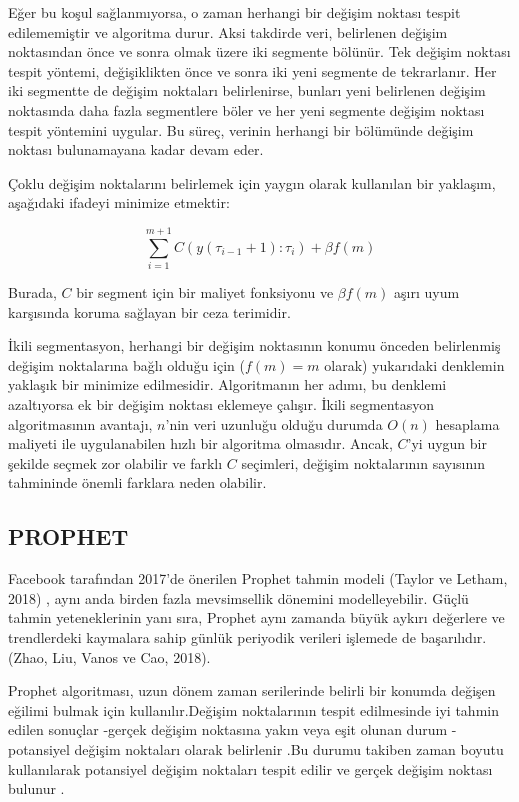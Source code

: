 \documentclass[12pt,twoside]{deuthesis}
\begin{document}
Eğer bu koşul sağlanmıyorsa, o zaman herhangi bir değişim noktası tespit edilememiştir ve algoritma durur. Aksi takdirde veri, belirlenen değişim noktasından önce ve sonra olmak üzere iki segmente bölünür. Tek değişim noktası tespit yöntemi, değişiklikten önce ve sonra iki yeni segmente de tekrarlanır. Her iki segmentte de değişim noktaları belirlenirse, bunları yeni belirlenen değişim noktasında daha fazla segmentlere böler ve her yeni segmente değişim noktası tespit yöntemini uygular. Bu süreç, verinin herhangi bir bölümünde değişim noktası bulunamayana kadar devam eder.

Çoklu değişim noktalarını belirlemek için yaygın olarak kullanılan bir yaklaşım, aşağıdaki ifadeyi minimize etmektir:

\[\sum_{i=1}^{m+1} C(y(\tau_{i-1}+1):\tau_i) + \beta f(m)\]

Burada, \(C\) bir segment için bir maliyet fonksiyonu ve \(\beta f(m)\) aşırı uyum karşısında koruma sağlayan bir ceza terimidir.

İkili segmentasyon, herhangi bir değişim noktasının konumu önceden belirlenmiş değişim noktalarına bağlı olduğu için (\(f(m) = m\) olarak) yukarıdaki denklemin yaklaşık bir minimize edilmesidir. Algoritmanın her adımı, bu denklemi azaltıyorsa ek bir değişim noktası eklemeye çalışır. İkili segmentasyon algoritmasının avantajı, \(n\)'nin veri uzunluğu olduğu durumda \(O(n)\) hesaplama maliyeti ile uygulanabilen hızlı bir algoritma olmasıdır. Ancak, \(C\)'yi uygun bir şekilde seçmek zor olabilir ve farklı \(C\) seçimleri, değişim noktalarının sayısının tahmininde önemli farklara neden olabilir.

\hypertarget{prophet}{%
\subsection{PROPHET}\label{prophet}}

Facebook tarafından 2017'de önerilen Prophet tahmin modeli (Taylor ve Letham, 2018) , aynı anda birden fazla mevsimsellik dönemini modelleyebilir. Güçlü tahmin yeteneklerinin yanı sıra, Prophet aynı zamanda büyük aykırı değerlere ve trendlerdeki kaymalara sahip günlük periyodik verileri işlemede de başarılıdır.(Zhao, Liu, Vanos ve Cao, 2018).

Prophet algoritması, uzun dönem zaman serilerinde belirli bir konumda değişen eğilimi bulmak için kullanılır.Değişim noktalarının tespit edilmesinde iyi tahmin edilen sonuçlar -gerçek değişim noktasına yakın veya eşit olunan durum - potansiyel değişim noktaları olarak belirlenir .Bu durumu takiben zaman boyutu kullanılarak potansiyel değişim noktaları tespit edilir ve gerçek değişim noktası bulunur .
\end{document}
